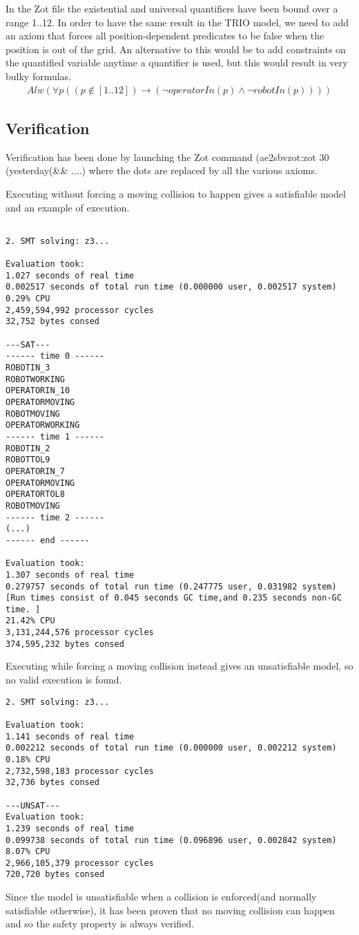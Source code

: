 In the Zot file the existential and universal quantifiers have been bound over a range 1..12. In order to have the same result in the TRIO model, we need to add an axiom that forces all position-dependent predicates to be false when the position is out of the grid. An alternative to this would be to add constraints on the quantified variable anytime a quantifier is used, but this would result in very bulky formulas.
\begin{align*}
	Alw(\forall p ((p\notin[1..12])\longrightarrow(\neg operatorIn(p)\land \neg robotIn(p))))
\end{align*}


\subsection{Verification}
Verification has been done by launching the Zot command	(ae2sbvzot:zot 30 (yesterday(\&\& ....) where the dots are replaced by all the various axioms.


\vspace{10mm}

Executing without forcing a moving collision to happen gives a satisfiable model and an example of execution.
\begin{verbatim}

2. SMT solving: z3...

Evaluation took:
1.027 seconds of real time
0.002517 seconds of total run time (0.000000 user, 0.002517 system)
0.29% CPU
2,459,594,992 processor cycles
32,752 bytes consed

---SAT---
------ time 0 ------
ROBOTIN_3
ROBOTWORKING
OPERATORIN_10
OPERATORMOVING
ROBOTMOVING
OPERATORWORKING
------ time 1 ------
ROBOTIN_2
ROBOTTOL9
OPERATORIN_7
OPERATORMOVING
OPERATORTOL8
ROBOTMOVING
------ time 2 ------
(...)
------ end ------

Evaluation took:
1.307 seconds of real time
0.279757 seconds of total run time (0.247775 user, 0.031982 system) 
[Run times consist of 0.045 seconds GC time,and 0.235 seconds non-GC time. ]
21.42% CPU
3,131,244,576 processor cycles
374,595,232 bytes consed
\end{verbatim}


\vspace{10mm}

Executing while forcing a moving collision instead gives an unsatisfiable model, so no valid execution is found.

\begin{verbatim}
2. SMT solving: z3...

Evaluation took:
1.141 seconds of real time
0.002212 seconds of total run time (0.000000 user, 0.002212 system)
0.18% CPU
2,732,598,183 processor cycles
32,736 bytes consed

---UNSAT---
Evaluation took:
1.239 seconds of real time
0.099738 seconds of total run time (0.096896 user, 0.002842 system)
8.07% CPU
2,966,105,379 processor cycles
720,720 bytes consed

\end{verbatim}



Since the model is unsatisfiable when a collision is enforced(and normally satisfiable otherwise), it has been proven that no moving collision can happen and so the safety property is always verified.
